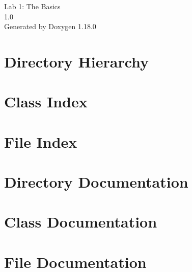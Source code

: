 \documentclass[twoside]{book}
\newcommand{\+}{\discretionary{\mbox{\scriptsize$\hookleftarrow$}}{}{}}
\newcommand{\clearemptydoublepage}{%
    \newpage{\pagestyle{empty}\cleardoublepage}%
  }
\begin{document}
  \raggedbottom
    \hypersetup{pageanchor=false,
                bookmarksnumbered=true,
                pdfencoding=unicode
               }
  \begin{titlepage}
  \vspace*{7cm}
  \begin{center}%
  {\Large Lab 1:\+ The Basics}\\
  [1ex]\large 1.\+0 \\
  \vspace*{1cm}
  {\large Generated by Doxygen 1.18.0}\\
  \end{center}
  \end{titlepage}
  \clearemptydoublepage
  \tableofcontents
  \clearemptydoublepage
  \hypersetup{pageanchor=true}
\chapter{Directory Hierarchy}

\chapter{Class Index}

\chapter{File Index}

\chapter{Directory Documentation}


\chapter{Class Documentation}

\chapter{File Documentation}





  \backmatter
  \newpage
  \clearemptydoublepage
  \printindex
\end{document}
